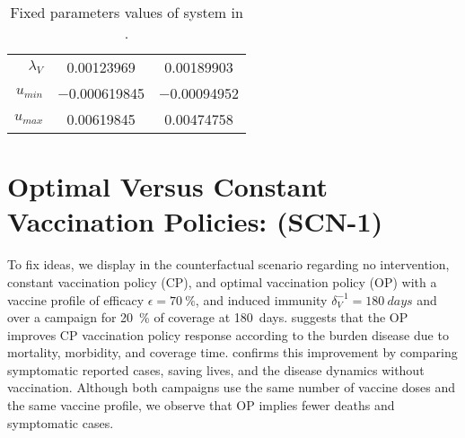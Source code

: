 \begin{table*}[tbh]
\begin{center}
\begin{tabular}{rc@{}c}
            $\lambda_{V}$
                & \num{0.00123969}
                & \num{0.00189903}
            \\
                $u_{min}$
                & \num{-0.000619845}
                & \num{-0.00094952}
            \\
                $u_{max}$
                & \num{0.00619845}
                & \num{0.00474758}
            \\
            \bottomrule
        \end{tabular}
        \caption{%
            Fixed parameters values of system in
            .}
        \label{tbl:fixed_parameters-OCM}
    \end{center}
\end{table*}
%
\section*{Optimal Versus Constant Vaccination Policies: (SCN-1)}
        To fix ideas, we display in
    the counterfactual scenario regarding no intervention, constant vaccination
    policy (CP), and optimal vaccination policy (OP) with a vaccine profile of
    efficacy $\epsilon = \SI{70}{\percent}$, and induced immunity
    $\delta_V^{-1} = \SI{180}{days}$ and over a campaign for \SI{20}{\percent}
    of coverage at \SI{180}{days}. 
    suggests that the OP improves CP vaccination policy response according to
    the burden disease due to mortality, morbidity, and coverage time.
     confirms this improvement by
    comparing symptomatic reported cases, saving lives, and the disease dynamics
    without vaccination. Although both campaigns use the same number of vaccine
    doses and the same vaccine profile, we observe that OP implies fewer deaths
    and symptomatic cases.

